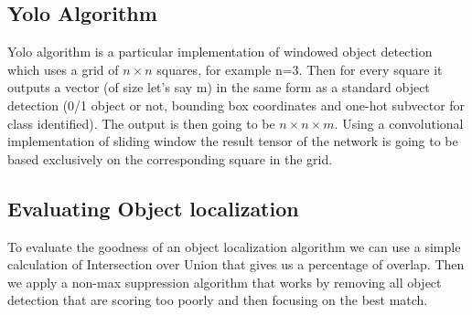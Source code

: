 \documentclass{article}
\begin{document}
\subsection*{Yolo Algorithm}
Yolo algorithm is a particular implementation of windowed object detection which uses a grid of $ n\times n $ squares, for example n=3. Then for every square it outputs a vector (of size let's say m) in the same form as a standard object detection (0/1 object or not, bounding box coordinates and one-hot subvector for class identified). The output is then going to be $n\times n\times m$. Using a convolutional implementation of sliding window the result tensor of the network is going to be based exclusively on the corresponding square in the grid.
\subsection*{Evaluating Object localization}
To evaluate the goodness of an object localization algorithm we can use a simple calculation of Intersection over Union that gives us a percentage of overlap. Then we apply a non-max suppression algorithm that works by removing all object detection that are scoring too poorly and then focusing on the best match. 


\end{document}
